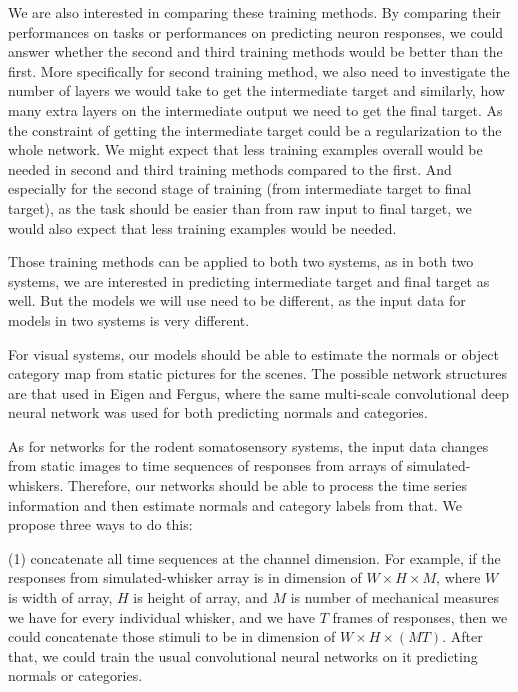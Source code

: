 \documentclass[12pt]{article}
\begin{document}
We are also interested in comparing these training methods. By comparing their performances on tasks or performances on predicting neuron responses, we could answer whether the second and third training methods would be better than the first. More specifically for second training method, we also need to investigate the number of layers we would take to get the intermediate target and similarly, how many extra layers on the intermediate output we need to get the final target. As the constraint of getting the intermediate target could be a regularization to the whole network. We might expect that less training examples overall would be needed in second and third training methods compared to the first. And especially for the second stage of training (from intermediate target to final target), as the task should be easier than from raw input to final target, we would also expect that less training examples would be needed.

Those training methods can be applied to both two systems, as in both two systems, we are interested in predicting intermediate target and final target as well. But the models we will use need to be different, as the input data for models in two systems is very different.

For visual systems, our models should be able to estimate the normals or object category map from static pictures for the scenes. The possible network structures are that used in Eigen and Fergus\cite{Eigen2014}, where the same multi-scale convolutional deep neural network was used for both predicting normals and categories.

As for networks for the rodent somatosensory systems, the input data changes from static images to time sequences of responses from arrays of simulated-whiskers. Therefore, our networks should be able to process the time series information and then estimate normals and category labels from that. We propose three ways to do this:

(1) concatenate all time sequences at the channel dimension. For example, if the responses from simulated-whisker array is in dimension of $W\times H \times M$, where $W$ is width of array, $H$ is height of array, and $M$ is number of mechanical measures we have for every individual whisker, and we have $T$ frames of responses, then we could concatenate those stimuli to be in dimension of $W \times H \times (MT)$. After that, we could train the usual convolutional neural networks on it predicting normals or categories.
\end{document}
